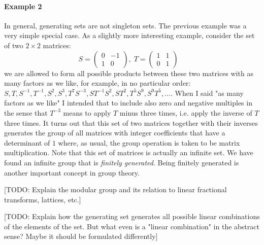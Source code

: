 \paragraph{Example 2} In general, generating sets are not singleton sets. The previous example was a very simple special case. As a slightly more interesting example, consider the set of two $2 \times 2$ matrices:
\begin{equation}
S = \begin{pmatrix}  0 & -1 \\  1  &  0  \end{pmatrix}, \;
T = \begin{pmatrix}  1 &  1 \\  0  &  1  \end{pmatrix} \quad
\end{equation}
we are allowed to form all possible products between these two matrices with as many factors as we like, for example, in no particular order: $S, T, S^{-1}, T^{-1}, S^2, S^3, T^7 S^{-3}, S T^{-1} S^2, S T^2, T^5 S^9, S^9 T^5, \ldots$. When I said "as many factors as we like" I intended that to include also zero and negative multiples in the sense that $T^{-3}$ means to apply $T$ minus three times, i.e. apply the inverse of $T$ three times. It turns out that this set of two matrices together with their inverses generates the group of all matrices with integer coefficients that have a determinant of $1$ where, as usual, the group operation is taken to be matrix multiplication. Note that this set of matrices is actually an infinite set. We have found an infinite group that is \emph{finitely generated}. Being finitely generated is another important concept in group theory.

[TODO: Explain the modular group and its relation to linear fractional transforms, lattices, etc.]

[TODO: Explain how the generating set generates all possible linear combinations of the elements of the set. But what even is a "linear combination" in the abstract sense? Maybe it should be formulated differently]

